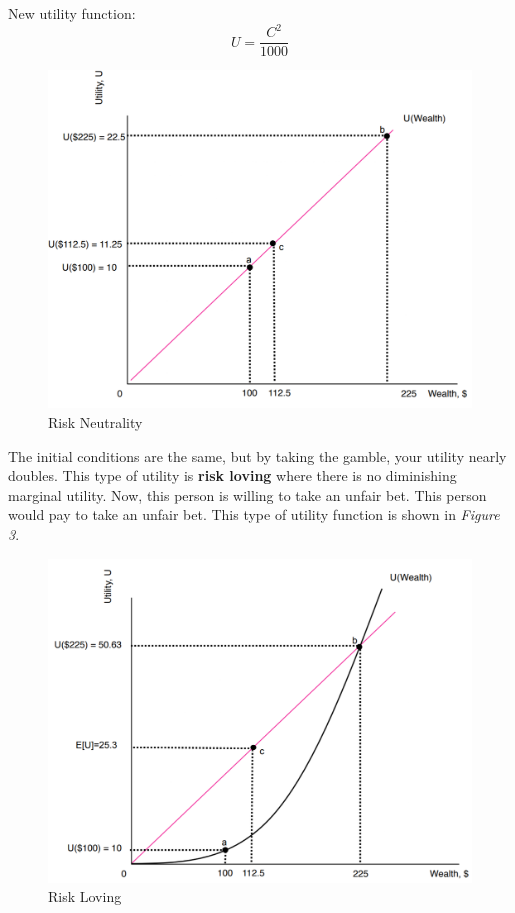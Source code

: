 \documentclass{article}
\begin{document}
New utility function:
$$U = \frac{C^2}{1000}$$

\begin{figure}[H]
    \centering
    \includegraphics[scale=0.60]{"Risk Neutrality"}
    \caption{Risk Neutrality}
\end{figure}

The initial conditions are the same, but by taking the gamble, your utility
nearly doubles. This type of utility is \textbf{risk loving} where there is no
diminishing marginal utility. Now, this person is willing to take an unfair bet.
This person would pay to take an unfair bet. This type of utility function is
shown in \textit{Figure 3}. 

\begin{figure}[H]
    \centering
    \includegraphics[scale=0.60]{"Risk Loving"}
    \caption{Risk Loving}
\end{figure}
\end{document}
